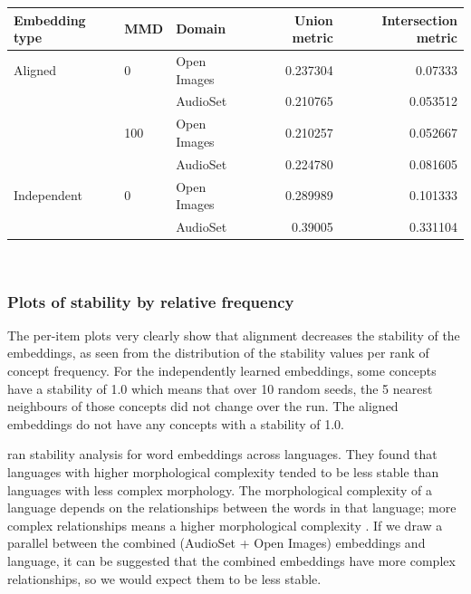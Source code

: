 \begin{table}[H]
\centering
\begin{tabular}{lllrr}
\toprule
Embedding type  & MMD    & Domain          & Union metric & Intersection metric         \\
\midrule
Aligned & 0   & Open Images &  0.237304 & 0.07333\\
            &     & AudioSet &  0.210765 & 0.053512\\
            & 100 & Open Images &  0.210257 & 0.052667\\
                   &     & AudioSet &  0.224780 & 0.081605\\
Independent & 0   & Open Images &  0.289989 & 0.101333 \\
                   &     & AudioSet &  0.39005 & 0.331104 \\
\bottomrule
\end{tabular}\\
\end{table}

\subsubsection{Plots of stability by relative frequency}

The per-item plots very clearly show that alignment decreases the stability of the embeddings, as seen from the distribution of the stability values per rank of concept frequency. For the independently learned embeddings, some concepts have a stability of 1.0 which means that over 10 random seeds, the 5 nearest neighbours of those concepts did not change over the run. The aligned embeddings do not have any concepts with a stability of 1.0. 

\cite{WordEmbeddingStability} ran stability analysis for word embeddings across languages. They found that languages with higher morphological complexity tended to be less stable than languages with less complex morphology. The morphological complexity of a language depends on the relationships between the words in that language; more complex relationships means a higher morphological complexity \cite{MorphologicalComplexity}. If we draw a parallel between the combined (AudioSet + Open Images) embeddings and language, it can be suggested that the combined embeddings have more complex relationships, so we would expect them to be less stable. 

